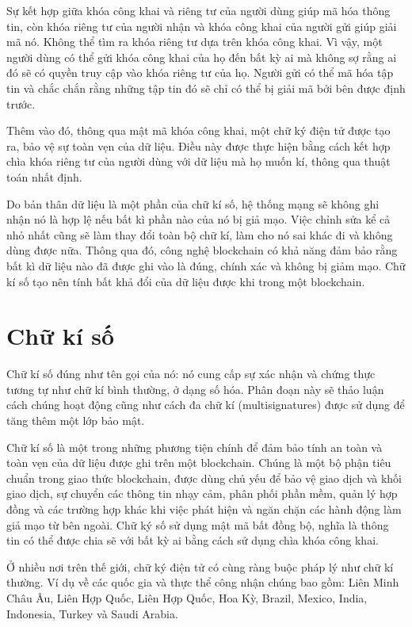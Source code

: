  Sự kết hợp giữa khóa công khai và riêng tư của người dùng giúp mã hóa thông tin, còn khóa riêng tư của người nhận và khóa công khai của người gửi giúp giải mã nó. Không thể tìm ra khóa riêng tư dựa trên khóa công khai. Vì vậy, một người dùng có thể gửi khóa công khai của họ đến bất kỳ ai mà không sợ rằng ai đó sẽ có quyền truy cập vào khóa riêng tư của họ. Người gửi có thể mã hóa tập tin và chắc chắn rằng những tập tin đó sẽ chỉ có thể bị giải mã bởi bên được định trước.
 
 Thêm vào đó, thông qua mật mã khóa công khai, một chữ ký điện tử được tạo ra, bảo vệ sự toàn vẹn của dữ liệu. Điều này được thực hiện bằng cách kết hợp chìa khóa riêng tư của người dùng với dữ liệu mà họ muốn kí, thông qua thuật toán nhất định.
 
 Do bản thân dữ liệu là một phần của chữ kí số, hệ thống mạng sẽ không ghi nhận nó là hợp lệ nếu bất kì phần nào của nó bị giả mạo.  Việc chỉnh sửa kể cả nhỏ nhất cũng sẽ làm thay đổi toàn bộ chữ kí, làm cho nó sai khác đi và không dùng được nữa. Thông qua đó, công nghệ blockchain có khả năng đảm bảo rằng bất kì dữ liệu nào đã được ghi vào là đúng, chính xác và không bị giảm mạo. Chữ kí số tạo nên tính bất khả đổi của dữ liệu được khi trong một blockchain.
 
 \section{Chữ kí số}
 
Chữ kí số đúng như tên gọi của nó: nó cung cấp sự xác nhận và chứng thực tương tự như chữ kí bình thường, ở dạng số hóa. Phân đoạn này sẽ thảo luận cách chúng hoạt động cũng như cách đa chữ kí (multisignatures) được sử dụng để tăng thêm một lớp bảo mật.
 
Chữ kí số là một trong những phương tiện chính để đảm bảo tính an toàn và toàn vẹn của dữ liệu được ghi trên một blockchain. Chúng là một bộ phận tiêu chuẩn trong giao thức blockchain, được dùng chủ yếu để bảo vệ giao dịch và khối giao dịch, sự chuyển các thông tin nhạy cảm, phân phối phần mềm, quản lý hợp đồng và các trường hợp khác khi việc phát hiện và ngăn chặn các  hành động làm giả mạo từ bên ngoài. Chữ ký số sử dụng mật mã bất đồng bộ, nghĩa là thông tin có thể được chia sẽ với bất kỳ ai bằng cách sử dụng chìa khóa công khai.
 
 Ở nhiều nơi trên thế giới, chữ ký điện tử có cùng ràng buộc pháp lý như chữ kí thường. Ví dụ về các quốc gia và thực thể  công nhận chúng bao gồm: Liên Minh Châu Âu, Liên Hợp Quốc, Liên Hợp Quốc, Hoa Kỳ, Brazil, Mexico, India, Indonesia, Turkey và Saudi Arabia.
 
